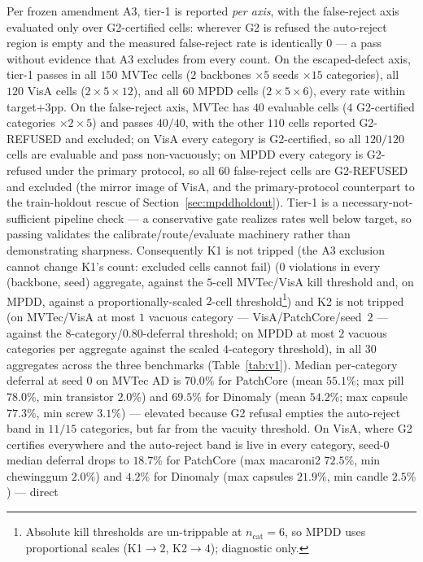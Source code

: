 \documentclass[11pt]{article}
\begin{document}
Per frozen amendment A3, tier-1 is reported \emph{per axis}, with the false-reject axis
evaluated only over G2-certified cells: wherever G2 is refused the auto-reject region is empty
and the measured false-reject rate is identically $0$ --- a pass without evidence that A3
excludes from every count. On the escaped-defect axis, tier-1 passes in all $150$
MVTec cells ($2$ backbones $\times 5$ seeds $\times 15$ categories), all $120$
VisA cells ($2 \times 5 \times 12$), and all $60$ MPDD cells ($2 \times 5 \times 6$),
every rate within target$+3$pp. On the false-reject
axis, MVTec has $40$ evaluable cells ($4$ G2-certified categories $\times 2 \times 5$) and
passes $40/40$, with the other $110$ cells reported G2-REFUSED and excluded; on VisA
every category is G2-certified, so all $120/120$ cells are evaluable and pass
non-vacuously; on MPDD every category is G2-refused under the primary protocol, so all $60$
false-reject cells are G2-REFUSED and excluded (the mirror image of VisA, and the primary-protocol
counterpart to the train-holdout rescue of Section~\ref{sec:mpddholdout}). Tier-1 is a necessary-not-sufficient pipeline check --- a conservative gate
realizes rates well below target, so passing validates the calibrate/route/evaluate machinery
rather than demonstrating sharpness. Consequently K1 is not tripped (the A3 exclusion
cannot change K1's count: excluded cells cannot fail) ($0$ violations in every
(backbone, seed) aggregate, against the $5$-cell MVTec/VisA kill threshold and, on MPDD, against
a proportionally-scaled $2$-cell threshold\footnote{Absolute kill thresholds are un-trippable at
$n_{\text{cat}}=6$, so MPDD uses proportional scales (K1$\to 2$, K2$\to 4$); diagnostic only.}) and K2 is
not tripped (on MVTec/VisA at most $1$ vacuous category --- VisA/PatchCore/seed~$2$ --- against the
$8$-category/$0.80$-deferral threshold; on MPDD at most $2$ vacuous categories per aggregate
against the scaled $4$-category threshold), in all $30$ aggregates across the three
benchmarks (Table~\ref{tab:v1}). Median per-category deferral at seed $0$ on MVTec AD is
$70.0\%$ for PatchCore (mean $55.1\%$; max pill $78.0\%$, min transistor $2.0\%$) and $69.5\%$
for Dinomaly (mean $54.2\%$; max capsule $77.3\%$, min screw $3.1\%$) --- elevated because G2 refusal
empties the auto-reject band in $11/15$ categories, but far from the vacuity threshold. On VisA,
where G2 certifies everywhere and the auto-reject band is live in every category, seed-$0$
median deferral drops to $18.7\%$ for PatchCore (max macaroni2 $72.5\%$, min chewinggum
$2.0\%$) and $4.2\%$ for Dinomaly (max capsules $21.9\%$, min candle $2.5\%$) --- direct
\end{document}
